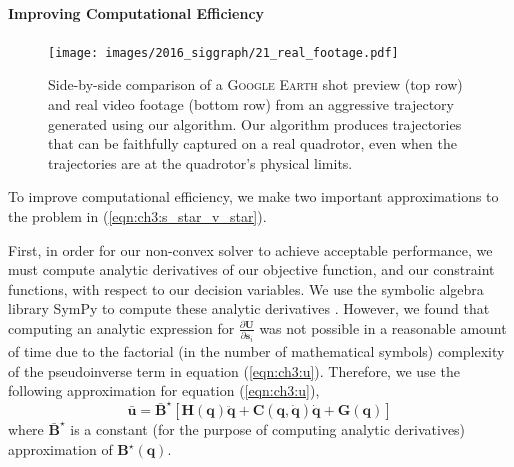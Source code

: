 \paragraph{Improving Computational Efficiency}

\begin{figure}[t]
\centering
\texttt{[image: images/2016\_siggraph/21\_real\_footage.pdf]}
\caption{
Side-by-side comparison of a \textsc{Google Earth} shot preview (top row) and real video footage (bottom row) from an aggressive trajectory generated using our algorithm.
Our algorithm produces trajectories that can be faithfully captured on a real quadrotor, even when the trajectories are at the quadrotor's physical limits.
}
\label{fig:ch3:real}
\end{figure}

To improve computational efficiency, we make two important approximations to the problem in (\ref{eqn:ch3:s_star_v_star}).


First, in order for our non-convex solver to achieve acceptable performance, we must compute analytic derivatives of our objective function, and our constraint functions, with respect to our decision variables.
We use the symbolic algebra library SymPy to compute these analytic derivatives \cite{sympy:2014}.
However, we found that computing an analytic expression for $\frac{ \partial \mathbf{U} }{ \partial \mathbf{s}_i } $ was not possible in a reasonable amount of time due to the factorial (in the number of mathematical symbols) complexity of the pseudoinverse term  in equation (\ref{eqn:ch3:u}).
Therefore, we use the following approximation for equation (\ref{eqn:ch3:u}),
%
\begin{equation}
\bar{\mathbf{u}} = \bar{\mathbf{B}}^{\star} \left[\mathbf{H}(\mathbf{q}) \ddot{\mathbf{q}} + \mathbf{C}(\mathbf{q},\dot{\mathbf{q}}) \dot{\mathbf{q}} + \mathbf{G}(\mathbf{q})\right]
\label{eqn:ch3:uhat}
\end{equation}
%
where $\bar{\mathbf{B}}^{\star}$ is a constant (for the purpose of computing analytic derivatives) approximation of $\mathbf{B}^{\star}(\mathbf{q})$.

